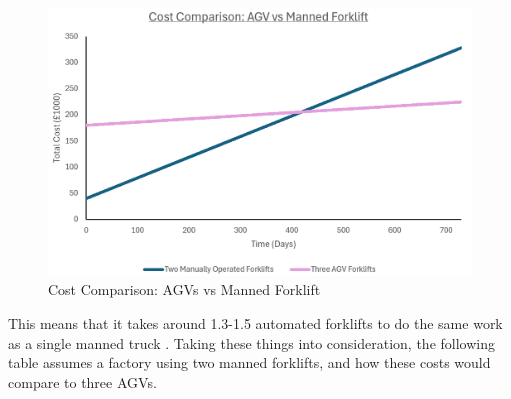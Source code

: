 \documentclass[12pt,titlepage]{article}
\begin{document}
\begin{figure}[ht]
    \centering
    \includegraphics[width=0.95\linewidth]{CostComparison1.png}
    \caption{Cost Comparison: AGVs vs Manned Forklift}
    \label{fig:timeline}
\end{figure}

This means that it takes around 1.3-1.5 automated forklifts to do the same work as a single manned truck \cite{Pastor-Tella2024}. Taking these things into consideration, the following table assumes a factory using two manned forklifts, and how these costs would compare to three AGVs.

\FloatBarrier
\end{document}
